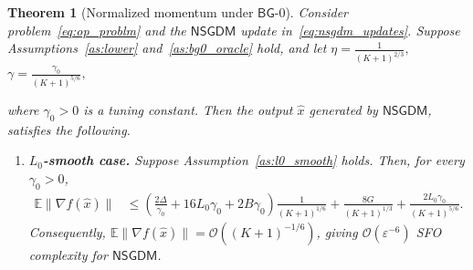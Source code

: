 \documentclass[letter,11pt]{article}
\newtheorem{theorem}{Theorem}[]
\newcommand{\E}{\mathbb{E}}
\newcommand{\Ocal}{\mathcal{O}}
\begin{document}
\begin{theorem}[Normalized momentum under $\mathsf{BG}$-0]
\label{thm:nsgdm_three_regimes}
Consider problem~\eqref{eq:op_problm} and the $\mathsf{NSGDM}$ update in~\eqref{eq:nsgdm_updates}. Suppose Assumptions~\ref{as:lower}
and~\ref{as:bg0_oracle} hold, and let $\eta = \frac{1}{(K+1)^{2/3}},$ $\gamma = \frac{\gamma_0}{(K+1)^{5/6}},$

where $\gamma_0>0$ is a tuning constant. Then the output $\widehat{x}$ generated by $\mathsf{NSGDM}$, satisfies the following.

\begin{enumerate}[label=(\roman*), leftmargin=*]

\item \textbf{$L_0$-smooth case.}
Suppose Assumption~\ref{as:l0_smooth} holds. Then, for every $\gamma_0>0$,
\[
\begin{aligned}
\E\|\nabla f(\widehat x)\| &\le
\left( \frac{2\Delta}{\gamma_0} +16L_0\gamma_0 +2B\gamma_0
\right)\frac{1}{(K+1)^{1/6}} + \frac{8G}{(K+1)^{1/3}} + \frac{2L_0\gamma_0}{(K+1)^{5/6}}.
\end{aligned}
\]
Consequently, $\E\|\nabla f(\widehat x)\| = \Ocal\!\left((K+1)^{-1/6}\right)$, giving $\Ocal(\varepsilon^{-6})$ SFO complexity for $\mathsf{NSGDM}$.


\end{enumerate}
\end{theorem}
\end{document}

